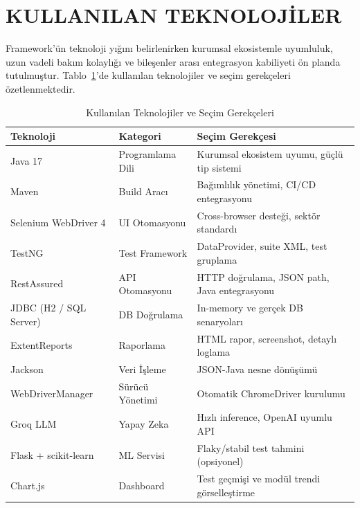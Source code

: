 
\section{KULLANILAN TEKNOLOJİLER}

Framework'ün teknoloji yığını belirlenirken kurumsal ekosistemle uyumluluk, uzun vadeli bakım kolaylığı ve bileşenler arası entegrasyon kabiliyeti ön planda tutulmuştur. Tablo~\ref{tab:teknolojiler}'de kullanılan teknolojiler ve seçim gerekçeleri özetlenmektedir.

\begin{table}[H]
\centering
\caption{Kullanılan Teknolojiler ve Seçim Gerekçeleri}
\label{tab:teknolojiler}
\small
\begin{tabular}{|l|l|p{5.8cm}|}
\hline
\textbf{Teknoloji} & \textbf{Kategori} & \textbf{Seçim Gerekçesi} \\
\hline
Java 17 & Programlama Dili & Kurumsal ekosistem uyumu, güçlü tip sistemi \\
\hline
Maven & Build Aracı & Bağımlılık yönetimi, CI/CD entegrasyonu \\
\hline
Selenium WebDriver 4 & UI Otomasyonu & Cross-browser desteği, sektör standardı \\
\hline
TestNG & Test Framework & DataProvider, suite XML, test gruplama \\
\hline
RestAssured & API Otomasyonu & HTTP doğrulama, JSON path, Java entegrasyonu \\
\hline
JDBC (H2 / SQL Server) & DB Doğrulama & In-memory ve gerçek DB senaryoları \\
\hline
ExtentReports & Raporlama & HTML rapor, screenshot, detaylı loglama \\
\hline
Jackson & Veri İşleme & JSON-Java nesne dönüşümü \\
\hline
WebDriverManager & Sürücü Yönetimi & Otomatik ChromeDriver kurulumu \\
\hline
Groq LLM & Yapay Zeka & Hızlı inference, OpenAI uyumlu API \\
\hline
Flask + scikit-learn & ML Servisi & Flaky/stabil test tahmini (opsiyonel) \\
\hline
Chart.js & Dashboard & Test geçmişi ve modül trendi görselleştirme \\
\hline
\end{tabular}
\end{table}

